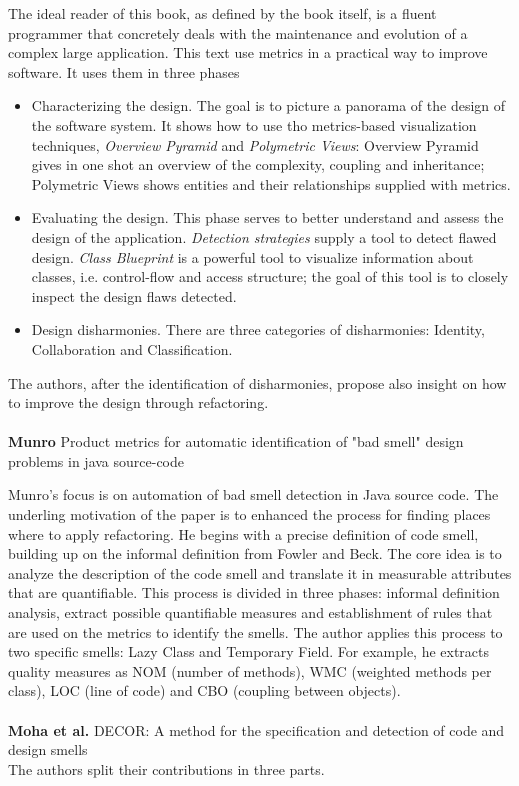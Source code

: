 The ideal reader of this book, as defined by the book itself, is a fluent programmer that concretely deals with the maintenance and evolution of a complex large application.
This text use metrics in a practical way to improve software. It uses them in three phases
\begin{itemize}
    \item Characterizing the design. The goal is to picture a panorama of the design of the software system. It shows how to use tho metrics-based visualization techniques, \emph{Overview Pyramid} and \emph{Polymetric Views}: Overview Pyramid gives in one shot an overview of the complexity, coupling and inheritance; Polymetric Views shows entities and their relationships supplied with metrics.
    \item Evaluating the design. This phase serves to better understand and assess the design of the application. \emph{Detection strategies} \cite{marinescu2004detection} supply a tool to detect flawed design. \emph{Class Blueprint} is a powerful tool to visualize information about classes, i.e. control-flow and access structure; the goal of this tool is to closely inspect the design flaws detected.
    \item Design disharmonies. There are three categories of disharmonies: Identity, Collaboration and Classification. 
\end{itemize}

The authors, after the identification of disharmonies, propose also insight on how to improve the design through refactoring.
\\
\\
\textbf{Munro} \cite{munro2005product} Product metrics for automatic identification of "bad smell" design problems in java source-code

Munro's focus is on automation of bad smell detection in Java source code. The underling motivation of the paper is to enhanced the process for finding places where to apply refactoring. He begins with a precise definition of code smell, building up on the informal definition from Fowler and Beck. The core idea is to analyze the description of the code smell and translate it in measurable attributes that are quantifiable. This process is divided in three phases: informal definition analysis, extract possible quantifiable measures and establishment of rules that are used on the metrics to identify the smells. 
The author applies this process to two specific smells: Lazy Class and Temporary Field. For example, he extracts quality measures as NOM (number of methods), WMC (weighted methods per class), LOC (line of code) and CBO (coupling between objects).
\\
\\
\textbf{Moha et al.} \cite{moha2009decor} DECOR: A method for the specification and detection of code and design smells
\\
The authors split their contributions in three parts. 

